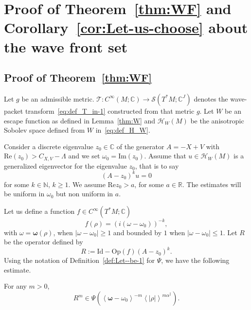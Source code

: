 \documentclass[AHL,Unicode,longabstracts,published]{cedram}
\newcommand{\clS}{\mathcal{S}}
\newcommand{\clT}{\mathcal{T}}
\newcommand{\clH}{\mathcal{H}}
\newcommand{\Ree}{\mathrm{Re}}
\newcommand{\Imm}{\mathrm{Im}}
\newcommand{\Opp}{\mathrm{Op}}
\newcommand{\Id}{\mathrm{Id}}
\newcommand{\bbR}{\mathbb{R}}
\newcommand{\bbC}{\mathbb{C}}
\newcommand{\bbN}{\mathbb{N}}
\newcommand{\Imm}{\mathrm{Im}}
\newcommand{\Ree}{\mathrm{Re}}
\newcommand{\clH}{\mathcal{H}}
\newcommand{\bbR}{\mathbb{R}}
\begin{document}
\section{Proof of Theorem~\ref{thm:WF} and Corollary~\ref{cor:Let-us-choose} about the wave front set}\label{sec:Proof-of-Theorem_WF}

\subsection{Proof of Theorem~\ref{thm:WF}}

Let $g$ be an admissible metric. $\clT:C^{\infty}(M;\bbC)\rightarrow\clS(T^{*}M;\bbC^{J})$ denotes the wave-packet transform~\eqref{eq:def_T_in-1} constructed from that metric $g$. Let $W$ be an escape function as defined in Lemma~\ref{thm:W} and $\clH _{W}\left(M\right)$ be the anisotropic Sobolev space defined from $W$ in~\eqref{eq:def_H_W}.

Consider a discrete eigenvalue $z_{0}\in\bbC$ of the generator $A=-X+V$ with $\Ree(z_{0})>C_{X,V}-\Lambda$ and we set $\omega_{0}=\Imm(z_{0})$. Assume that $u\in\clH _{W}\left(M\right)$ is a generalized eigenvector for the eigenvalue $z_{0}$, that is to say
\begin{equation}\label{eq:Aku}
\left(A-z_{0}\right)^{k}u=0
\end{equation}
for some $k\in\bbN$, $k\geq1$. We assume $\Ree z_{0}>a$, for some $a\in\bbR$. The estimates will be uniform in $\omega_{0}$ but non uniform in $a$.

Let us define a function $f\in C^{\infty}\left(T^{*}M;\bbC\right)$
\[
f\left(\rho\right)=\left(i\left(\omega-\omega_{0}\right)\right)^{-k},
\]
with $\omega=\boldsymbol{\omega}(\rho)$, when $|\omega-\omega_{0}|\geq1$ and bounded by $1$ when $|\omega-\omega_{0}|\leq1$. Let $R$ be the operator defined by
\begin{equation}\label{eq:def_R-2}
R:=\Id -\Opp (f)(A-z_{0})^{k}.
\end{equation}
Using the notation of Definition~\ref{def:Let--be-1} for $\Psi$, we have the following estimate.
\begin{lem}
For any $m>0$,
\begin{equation}\label{eq:Rm}
R^{m}\in\Psi\left(\left\langle \boldsymbol{\omega}-\omega_{0}\right\rangle ^{-m}\left\langle \left|\rho\right|\right\rangle ^{m\alpha^{\parallel}}\right).
\end{equation}
\end{lem}
\end{document}
